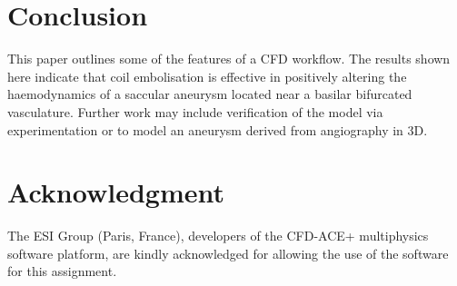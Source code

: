 \documentclass[journal,twoside,web]{ieeecolor}
\begin{document}
\section{Conclusion}
This paper outlines some of the features of a CFD workflow. The results shown here indicate that coil embolisation is effective in positively altering the haemodynamics of a saccular aneurysm located near a basilar bifurcated vasculature. Further work may include verification of the model via experimentation or to model an aneurysm derived from angiography in 3D.
\section*{Acknowledgment}
The ESI Group (Paris, France), developers of the CFD-ACE+ multiphysics software platform, are kindly acknowledged for allowing the use of the software for this assignment.


\end{document}
